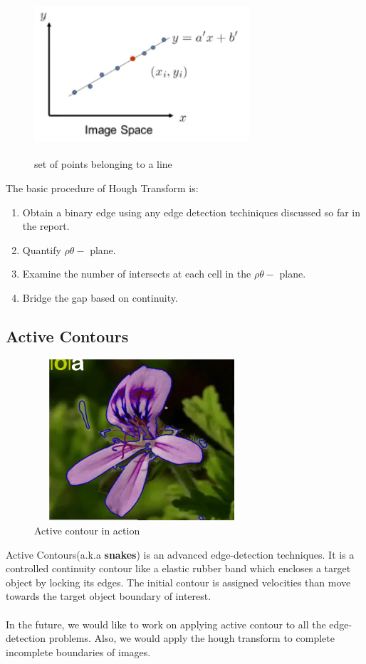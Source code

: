 \begin{figure}[h!]
  \centering
  \includegraphics[width=8cm,height=6cm,keepaspectratio]{img/hough.png}
  \caption{set of points belonging to a line}
\end{figure}

The basic procedure of Hough Transform is:
\begin{enumerate}
\item Obtain a binary edge using any edge detection techiniques discussed so far in the report.
\item Quantify $\rho\theta-$ plane.
\item Examine the number of intersects at each cell in the $\rho\theta-$ plane.
\item Bridge the gap based on continuity.
\end{enumerate}

\subsection{Active Contours}
\begin{figure}[h!]
  \centering
  \includegraphics[width=8cm,height=6cm,keepaspectratio]{img/active_contour.png}
  \caption{Active contour in action}
\end{figure}

Active Contours(a.k.a \textbf{snakes}) is an advanced edge-detection techniques. It is a controlled continuity contour like a elastic rubber band which encloses a target object by locking its edges. The initial contour is assigned velocities than move towards the target object boundary of interest.
\\
\\
In the future, we would like to work on applying active contour to all the edge-detection problems. Also, we would apply the hough transform to complete incomplete boundaries of images.

